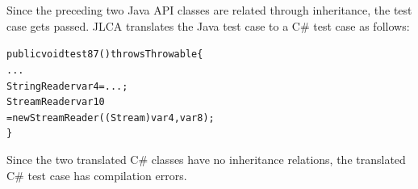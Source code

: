 Since the preceding two Java API classes are related through inheritance, the test case gets passed. JLCA translates the Java test case to a C\# test case as follows:

\begin{CodeOut}%
\begin{alltt}
public void test87() throws Throwable\{
  ...
  StringReader var4 = ...;
  StreamReader var10
    = new StreamReader((Stream)var4, var8);
\}
\end{alltt}
\end{CodeOut}%

Since the two translated C\# classes have no inheritance relations, the translated C\# test case has compilation errors.

